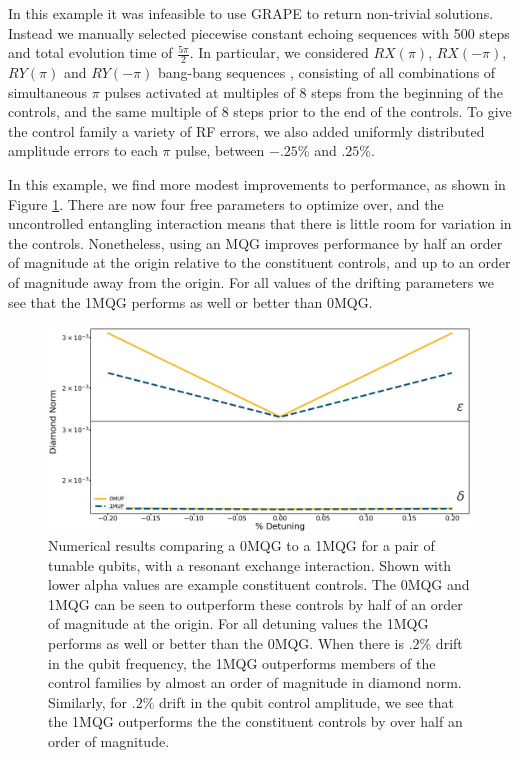 \documentclass[aps,nofootinbib,pra,notitlepage,twocolumn]{revtex4-1}
\begin{document}
In this example it was infeasible to use GRAPE to return non-trivial solutions. Instead we manually selected piecewise constant echoing sequences with 500 steps and total evolution time of $\frac{5\pi}{2}$. In particular, we considered $RX(\pi)$, $RX(-\pi)$, $RY(\pi)$ and $RY(-\pi)$ bang-bang sequences \cite{bangbang}, consisting of all combinations of simultaneous $\pi$ pulses activated at multiples of $8$ steps from the beginning of the controls, and the same multiple of $8$ steps prior to the end of the controls. To give the control family a variety of RF errors, we also added uniformly distributed amplitude errors to each $\pi$ pulse, between $-.25$\% and $.25$\%.

In this example, we find more modest improvements to performance, as shown in Figure \ref{fig:2MQG}. There are now four free parameters to optimize over, and the uncontrolled entangling interaction means that there is little room for variation in the controls. Nonetheless, using an MQG improves performance by half an order of magnitude at the origin relative to the constituent controls, and up to an order of magnitude away from the origin. For all values of the drifting parameters we see that the 1MQG performs as well or better than 0MQG.

\begin{figure}
  \centering
  \includegraphics[width=\columnwidth]{2QRBC_no_member.png}
  \caption{Numerical results comparing a 0MQG to a 1MQG for a pair of tunable qubits, with a resonant exchange interaction. Shown with lower alpha values are example constituent controls. The 0MQG and 1MQG can be seen to outperform these controls by half of an order of magnitude at the origin. For all detuning values the 1MQG performs as well or better than the 0MQG. When there is $.2\%$ drift in the qubit frequency, the 1MQG outperforms members of the control families by almost an order of magnitude in diamond norm. Similarly, for $.2\%$ drift in the qubit control amplitude, we see that the 1MQG outperforms the the constituent controls by over half an order of magnitude.}
  \label{fig:2MQG}
\end{figure}
\end{document}
